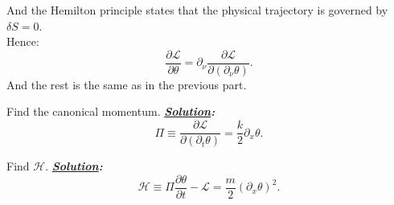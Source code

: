 \documentclass[notitlepage]{report}
\begin{document}
\begin{question}[title = Question 2]{}{}
\begin{question}[title = Part 2]{}{}
And the Hemilton principle states that the physical trajectory is governed by $\delta S=0 $.\\
Hence:\\
\[
\frac{\partial\mathcal{L}}{\partial\theta}=\partial_\nu \frac{\partial\mathcal{L}}{\partial \left(\partial_\nu\theta\right) }
.\] 
And the rest is the same as in the previous part.
\end{question}
\begin{question}[title = Part 3]{}{}
Find the canonical momentum.
\tcblower
\textbf{\emph{\underline{Solution}:}}\\
\[
	\Pi\equiv\frac{\partial\mathcal{L}}{\partial\left(\partial_t\theta\right)}=\frac{k}{2}\partial_x\theta
.\] 
\end{question}
\begin{question}[title = Part 4]{}{}
Find $\mathcal{H}$.
\tcblower
\textbf{\emph{\underline{Solution}:}}\\
\[
	\mathcal{H}\equiv\Pi\frac{\partial\theta}{\partial t}-\mathcal{L}=\frac{m}{2}\left(\partial_x\theta\right)^2 
.\] 
\end{question}
\end{question}
\newpage
\end{document}
